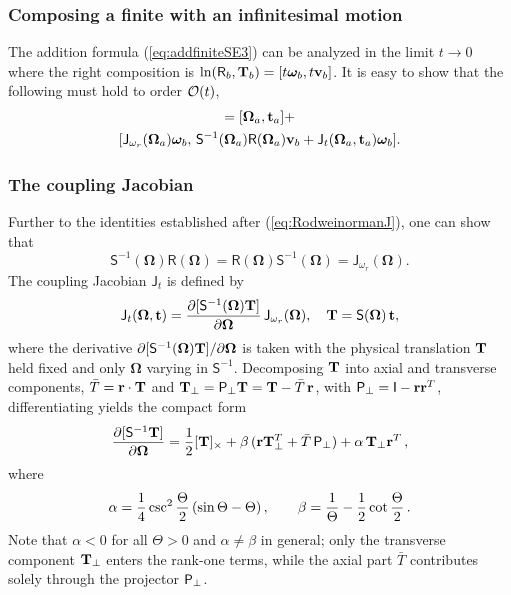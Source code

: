 \documentclass[journal]{IEEEtran}
\newcommand{\bfomega}{\boldsymbol{\omega}}
\newcommand{\bfOmega}{\boldsymbol{\Omega}}
\newcommand{\beq}{\begin{equation}}
\newcommand{\eeq}{\end{equation}}
\begin{document}
\subsubsection{Composing a finite with an infinitesimal motion}
The addition formula (\ref{eq:addfiniteSE3}) can be analyzed in the limit $t\rightarrow 0$ where the right composition is $\ln (\mathsf{R}_b,{\bf T}_b) = [t \bfomega_b, t {\bf v}_b]$. It is easy to show that the following must hold to order ${\cal O}(t)$,
\begin{multline}
    [\bfOmega_c,{\bf t}_c] = [\bfOmega_a,{\bf t}_a] + \\
    [\mathsf{J}_{\omega_r}(\bfOmega_a)\bfomega_b,\, 
    \mathsf{S}^{-1}(\bfOmega_a)\mathsf{R}(\bfOmega_a){\bf v}_b + \mathsf{J}_{t}(\bfOmega_a,{\bf t}_a)\bfomega_b].
    \label{eq:SE3vectoraddition}
\end{multline}

\subsubsection{The coupling Jacobian}
Further to the identities established after (\ref{eq:RodweinormanJ}), one can show that
\beq
    \mathsf{S}^{-1}(\bfOmega)\mathsf{R}(\bfOmega) = \mathsf{R}(\bfOmega)\mathsf{S}^{-1}(\bfOmega) =
    \mathsf{J}_{\omega_r}(\bfOmega).
    \label{eq:SinvRidentity}
\eeq
The coupling Jacobian $\mathsf{J}_{t}$ is defined by
\beq
    \mathsf{J}_{t}(\bfOmega,{\bf t}) = {\partial [\mathsf{S}^{-1}(\bfOmega){\bf T}] \over
    \partial \bfOmega} \, \mathsf{J}_{\omega_r}(\bfOmega),\quad {\bf T} = \mathsf{S}(\bfOmega) \, {\bf t},
    \label{eq:couplingJacobian}
\eeq
where the derivative $\partial[\mathsf{S}^{-1}(\bfOmega){\bf T}]/\partial\bfOmega$
is taken with the physical translation ${\bf T}$ held fixed
and only $\bfOmega$ varying in $\mathsf{S}^{-1}$.
Decomposing ${\bf T}$ into axial and transverse components,
$\bar T = {\bf r}\cdot{\bf T}$ and
${\bf T}_\perp = {\sf P}_\perp{\bf T} = {\bf T} - \bar T\,{\bf r}$,
with ${\sf P}_\perp = \mathsf{I} - {\bf r}{\bf r}^T$,
differentiating yields the compact form
\beq
    \frac{\partial[\mathsf{S}^{-1}{\bf T}]}{\partial\bfOmega} =
    \frac{1}{2}[{\bf T}]_\times
    + \beta\,({\bf r}{\bf T}_\perp^T + \bar T\,{\sf P}_\perp)
    + \alpha\,{\bf T}_\perp{\bf r}^T\,,
    \label{eq:dSinvTdOmega}
\eeq
where
\beq
    \alpha = {1\over 4}\csc^2{\Theta\over 2}\,(\sin\Theta - \Theta)\,,\qquad
    \beta = {1\over\Theta} - {1\over 2}\cot{\Theta\over 2}\,.
    \label{eq:alphabetadef}
\eeq
Note that $\alpha < 0$ for all $\Theta > 0$ and $\alpha \neq \beta$ in general;
only the transverse component ${\bf T}_\perp$ enters the rank-one terms,
while the axial part $\bar T$ contributes solely through the projector ${\sf P}_\perp$.
\end{document}
